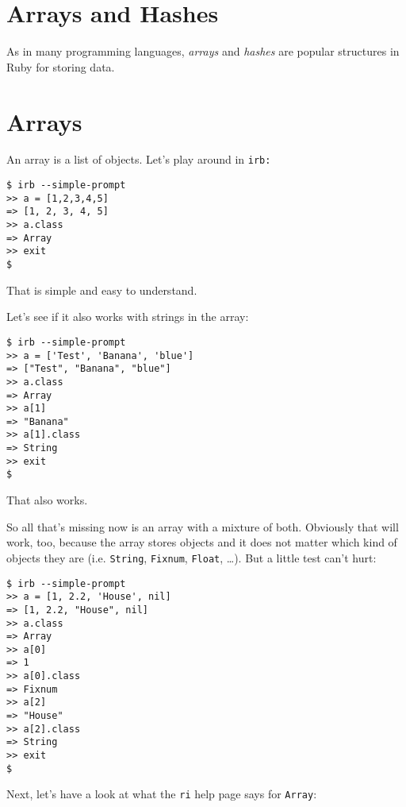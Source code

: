 \documentclass[a4paper]{book}
\begin{document}
\section{Arrays and Hashes}\label{arrays-and-hashes}

As in many programming languages, \emph{arrays} and \emph{hashes} are popular structures in Ruby for storing data.

\section{Arrays}\label{arrays}

An array is a list of objects. Let's play around in \texttt{irb:}

\begin{shaded}\begin{verbatim}
$ irb --simple-prompt
>> a = [1,2,3,4,5]
=> [1, 2, 3, 4, 5]
>> a.class
=> Array
>> exit
$
\end{verbatim}\end{shaded}

That is simple and easy to understand.

Let's see if it also works with strings in the array:

\begin{shaded}\begin{verbatim}
$ irb --simple-prompt
>> a = ['Test', 'Banana', 'blue']
=> ["Test", "Banana", "blue"]
>> a.class
=> Array
>> a[1]
=> "Banana"
>> a[1].class
=> String
>> exit
$
\end{verbatim}\end{shaded}

That also works.

So all that's missing now is an array with a mixture of both. Obviously that will work, too, because the array stores objects and it does not matter which kind of objects they are (i.e. \texttt{String}, \texttt{Fixnum}, \texttt{Float}, \ldots{}). But a little test can't hurt:

\begin{shaded}\begin{verbatim}
$ irb --simple-prompt
>> a = [1, 2.2, 'House', nil]
=> [1, 2.2, "House", nil]
>> a.class
=> Array
>> a[0]
=> 1
>> a[0].class
=> Fixnum
>> a[2]
=> "House"
>> a[2].class
=> String
>> exit
$
\end{verbatim}\end{shaded}

Next, let's have a look at what the \texttt{ri} help page says for \texttt{Array}:
\end{document}

